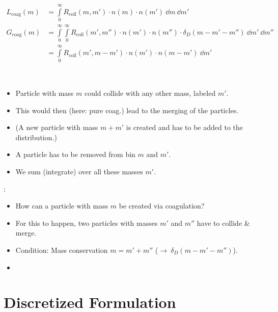 




    \clearpage 

    \begin{align}
        L_\text{coag}(m)
            &= \int\limits_0^\infty R_\text{coll}(m, m') \cdot n(m) \cdot n(m') \ \dd m \ \dd m' \\
        G_\text{coag}(m)
            &= \int\limits_0^\infty \int\limits_0^\infty R_\text{coll}(m', m'') \cdot
                n(m') \cdot n(m'') \cdot \delta_D(m-m'-m'') \ \dd m' \ \dd m'' \\
            &= \int\limits_0^\infty R_\text{coll}(m', m-m') \cdot n(m') \cdot n(m-m') \ \dd m'
    \end{align}

     \\

    \begin{itemize}
        \item Particle with mass $m$ could collide with any other mass, labeled $m'$.
        \item This would then (here: pure coag.) lead to the merging of the particles.
        \item (A new particle with mass $m+m'$ is created and has to be added to the distribution.)
        \item A particle has to be removed from bin $m$ and $m'$.
        \item We sum (integrate) over all these masses $m'$.
    \end{itemize}

    :
    \begin{itemize}
        \item How can a particle with mass $m$ be created via coagulation?
        \item For this to happen, two particles with masses $m'$ and $m''$ have to collide \& merge.
        \item Condition: Mass conservation $m=m'+m''$ ($\to\ \delta_D(m-m'-m'')$).
        \item 
    \end{itemize}

\section{Discretized Formulation}

